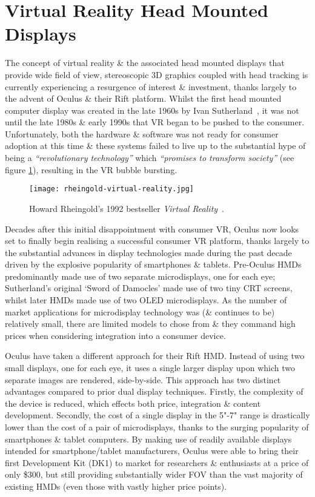 \section{Virtual Reality Head Mounted Displays}
The concept of virtual reality \& the associated head mounted displays that provide wide field of view, stereoscopic 3D graphics coupled with head tracking is currently experiencing a resurgence of interest \& investment, thanks largely to the advent of Oculus \& their Rift platform. Whilst the first head mounted computer display was created in the late 1960s by Ivan Sutherland~\cite{Rheingold1992}, it was not until the late 1980s \& early 1990s that VR began to be pushed to the consumer. Unfortunately, both the hardware \& software was not ready for consumer adoption at this time \& these systems failed to live up to the substantial hype of being a \textit{``revolutionary technology''} which \textit{``promises to transform society''} (see figure \ref{rheingold-virtual-reality.jpg}), resulting in the VR bubble bursting.

\begin{figure}[h]
	\begin{center}
		\texttt{[image: rheingold-virtual-reality.jpg]}
		\caption{Howard Rheingold's 1992 bestseller \textit{Virtual Reality}~\cite{Rheingold1992}.}
		\label{rheingold-virtual-reality.jpg}
	\end{center}
\end{figure}

Decades after this initial disappointment with consumer VR, Oculus now looks set to finally begin realising a successful consumer VR platform, thanks largely to the substantial advances in display technologies made during the past decade driven by the explosive popularity of smartphones \& tablets. Pre-Oculus HMDs predominantly made use of two separate microdisplays, one for each eye; Sutherland's original `Sword of Damocles' made use of two tiny CRT screens, whilst later HMDs made use of two OLED microdisplays. As the number of market applications for microdisplay technology was (\& continues to be) relatively small, there are limited models to chose from \& they command high prices when considering integration into a consumer device.

Oculus have taken a different approach for their Rift HMD. Instead of using two small displays, one for each eye, it uses a single larger display upon which two separate images are rendered, side-by-side. This approach has two distinct advantages compared to prior dual display techniques. Firstly, the complexity of the device is reduced, which effects both price, integration \& content development. Secondly, the cost of a single display in the 5"-7" range is drastically lower than the cost of a pair of microdisplays, thanks to the surging popularity of smartphones \& tablet computers. By making use of readily available displays intended for smartphone/tablet manufacturers, Oculus were able to bring their first Development Kit (DK1) to market for researchers \& enthusiasts at a price of only \$300, but still providing substantially wider FOV than the vast majority of existing HMDs (even those with vastly higher price points).


